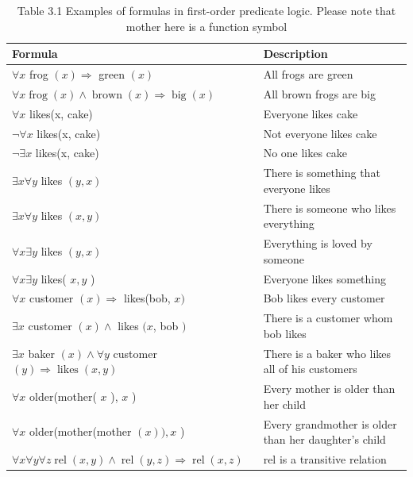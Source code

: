 \documentclass[10pt]{book}
\begin{document}
\begin{table}[htbp]
\begin{center}
\captionsetup{labelformat=empty}
\caption{Table 3.1 Examples of formulas in first-order predicate logic. Please note that mother here is a function symbol}
\begin{tabular}{|l|l|}
\hline
Formula & Description \\
\hline
$\forall x$ frog $(x) \Rightarrow$ green $(x)$ & All frogs are green \\
\hline
$\forall x \operatorname{frog}(x) \wedge \operatorname{brown}(x) \Rightarrow \operatorname{big}(x)$ & All brown frogs are big \\
\hline
$\forall x$ likes(x, cake) & Everyone likes cake \\
\hline
$\neg \forall x$ likes(x, cake) & Not everyone likes cake \\
\hline
$\neg \exists x$ likes(x, cake) & No one likes cake \\
\hline
$\exists x \forall y$ likes $(y, x)$ & There is something that everyone likes \\
\hline
$\exists x \forall y$ likes $(x, y)$ & There is someone who likes everything \\
\hline
$\forall x \exists y$ likes $(y, x)$ & Everything is loved by someone \\
\hline
$\forall x \exists y$ likes( $x, y$ ) & Everyone likes something \\
\hline
$\forall x$ customer $(x) \Rightarrow$ likes(bob, $x)$ & Bob likes every customer \\
\hline
$\exists x$ customer $(x) \wedge$ likes $(x$, bob $)$ & There is a customer whom bob likes \\
\hline
$\exists x$ baker $(x) \wedge \forall y$ customer $(y) \Rightarrow \operatorname{likes}(x, y)$ & There is a baker who likes all of his customers \\
\hline
$\forall x$ older(mother( $x$ ), $x$ ) & Every mother is older than her child \\
\hline
$\forall x$ older(mother(mother $(x)), x$ ) & Every grandmother is older than her daughter's child \\
\hline
$\forall x \forall y \forall z \operatorname{rel}(x, y) \wedge \operatorname{rel}(y, z) \Rightarrow \operatorname{rel}(x, z)$ & rel is a transitive relation \\
\hline
\end{tabular}
\end{center}
\end{table}
\end{document}
